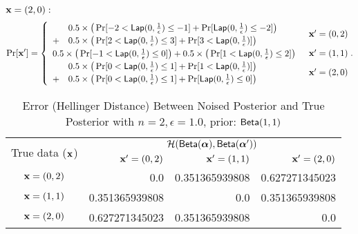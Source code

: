 \documentclass{article}
\begin{document}
{\noindent $\textbf{x} = (2,0):$
\[
\Pr[\textbf{x}']
= \begin{cases}
\begin{array}{ll}
 	& 0.5 \times 
 	\big(
 	\Pr[	-2	< \mathsf{Lap}(0, \frac{1}{\epsilon})	\leq	-1] 
 	+ 
 	\Pr[	\mathsf{Lap}(0, \frac{1}{\epsilon})			\leq 	-2] 
 	\big) \\
 	+ 	
 	& 0.5 \times 
 	\big(
 	\Pr[	2	< \mathsf{Lap}(0, \frac{1}{\epsilon})	\leq	3] 
 	+ 
 	\Pr[	3	< \mathsf{Lap}(0, \frac{1}{\epsilon})] 
 	\big) 
\end{array} 
	& \textbf{x}' = (0, 2)\\
\begin{array}{ll}
 	0.5 \times 
 	\big(
 	\Pr[	-1	< \mathsf{Lap}(0, \frac{1}{\epsilon})	\leq	0] 
 	\big)
 	+ 	
 	0.5 \times 
 	\big(
 	\Pr[	1	< \mathsf{Lap}(0, \frac{1}{\epsilon})	\leq	2] 
 	\big) 
\end{array}  
	& \textbf{x}' = (1, 1)\\
\begin{array}{ll}
 	& 0.5 \times 
 	\big(
 	\Pr[	0	<	\mathsf{Lap}(0, \frac{1}{\epsilon})	\leq	1] 
 	+ 
 	\Pr[	1	<	\mathsf{Lap}(0, \frac{1}{\epsilon})]
 	\big) \\
 	+ 	
 	& 0.5 \times 
 	\big(
 	\Pr[	0	< \mathsf{Lap}(0, \frac{1}{\epsilon})	\leq	1] 
 	+ 
 	\Pr[	\mathsf{Lap}(0, \frac{1}{\epsilon})			\leq	0] 
 	\big) 
\end{array}  
& \textbf{x}' = (2, 0)
\end{cases}.
\]
}


\begin{table}[htbp]
	\centering
	\caption{Error (Hellinger Distance) Between Noised Posterior and True Posterior with $n = 2, \epsilon = 1.0$, prior: $\mathsf{Beta}(1,1)$}
	\label{tab_n2error}
\begin{tabular}{|c||r|r|r|}
	\hline

	\multirow{2}{*}{True data ($\textbf{x}$)} 	
								& \multicolumn{3}{c|}{$\mathcal{H}(\mathsf{Beta}(\boldsymbol{\alpha}), \mathsf{Beta}(\boldsymbol{\alpha}'))$}  		
								\\ \cline{2-4}
	                      		& $\textbf{x}' = (0, 2)$
	                      		& $\textbf{x}' = (1, 1)$
	                      		& $\textbf{x}' = (2, 0)$
	                      		\\  \hline \hline
	$\textbf{x} = (0,2)$          & 0.0	
								& 0.351365939808
								& 0.627271345023 
								\\  \hline
	$\textbf{x} = (1,1)$          & 0.351365939808	
								& 0.0			
								& 0.351365939808
								\\  \hline
	$\textbf{x} = (2,0)$          & 0.627271345023
								& 0.351365939808 			
								& 0.0
								\\  \hline
\end{tabular}
\end{table}
\end{document}
